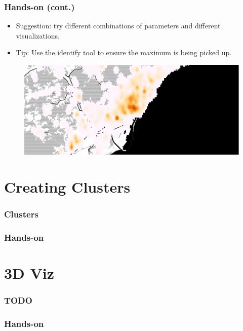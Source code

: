 \documentclass[hyperref={pdfpagelabels=true}]{beamer}
\begin{document}
\begin{frame}
\frametitle{Hands-on (cont.)}

\begin{itemize}  
    \item<1->Suggestion: try different combinations of parameters and different visualizations.    
    \item<1->Tip: Use the identify tool to ensure the maximum is being picked up.
\end{itemize}  

  \begin{figure}  
      \includegraphics[width=\textwidth]{heatmap1.png}\\
    \end{figure}         

\end{frame}

\section{Creating Clusters} 
\begin{frame}
\frametitle{Clusters}


\end{frame}

\begin{frame}
\frametitle{Hands-on}


\end{frame}

\section{3D Viz} 
\begin{frame}
\frametitle{TODO}


\end{frame}

\begin{frame}
\frametitle{Hands-on}


\end{frame}
\end{document}
